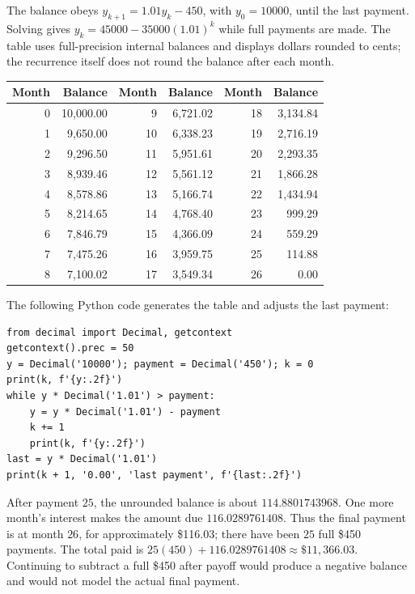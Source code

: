 The balance obeys $y_{k+1}=1.01y_k-450$, with $y_0=10000$, until the last
payment. Solving gives $y_k=45000-35000(1.01)^k$ while full payments are made.
The table uses full-precision internal balances and displays dollars rounded
to cents; the recurrence itself does not round the balance after each month.
\begin{center}\begin{tabular}{rrrrrr}
\toprule
Month&Balance&Month&Balance&Month&Balance\\\midrule
0&10,000.00&9&6,721.02&18&3,134.84\\
1&9,650.00&10&6,338.23&19&2,716.19\\
2&9,296.50&11&5,951.61&20&2,293.35\\
3&8,939.46&12&5,561.12&21&1,866.28\\
4&8,578.86&13&5,166.74&22&1,434.94\\
5&8,214.65&14&4,768.40&23&999.29\\
6&7,846.79&15&4,366.09&24&559.29\\
7&7,475.26&16&3,959.75&25&114.88\\
8&7,100.02&17&3,549.34&26&0.00\\
\bottomrule\end{tabular}\end{center}
The following Python code generates the table and adjusts the last payment:
\begin{verbatim}
from decimal import Decimal, getcontext
getcontext().prec = 50
y = Decimal('10000'); payment = Decimal('450'); k = 0
print(k, f'{y:.2f}')
while y * Decimal('1.01') > payment:
    y = y * Decimal('1.01') - payment
    k += 1
    print(k, f'{y:.2f}')
last = y * Decimal('1.01')
print(k + 1, '0.00', 'last payment', f'{last:.2f}')
\end{verbatim}
After payment $25$, the unrounded balance is about $114.8801743968$.
One more month's interest makes the amount due $116.0289761408$.
Thus the final payment is at month $26$, for approximately \$116.03;
there have been $25$ full \$450 payments. The total paid is
$25(450)+116.0289761408\approx\$11{,}366.03$.
Continuing to subtract a full \$450 after payoff would produce a negative
balance and would not model the actual final payment.

